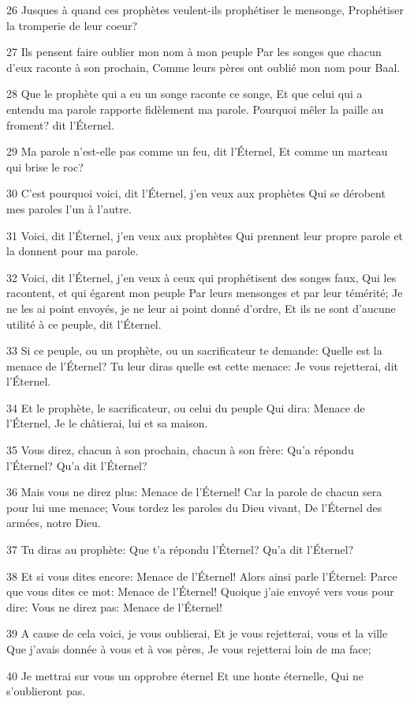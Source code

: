 \par 26 Jusques à quand ces prophètes veulent-ils prophétiser le mensonge, Prophétiser la tromperie de leur coeur?
\par 27 Ils pensent faire oublier mon nom à mon peuple Par les songes que chacun d'eux raconte à son prochain, Comme leurs pères ont oublié mon nom pour Baal.
\par 28 Que le prophète qui a eu un songe raconte ce songe, Et que celui qui a entendu ma parole rapporte fidèlement ma parole. Pourquoi mêler la paille au froment? dit l'Éternel.
\par 29 Ma parole n'est-elle pas comme un feu, dit l'Éternel, Et comme un marteau qui brise le roc?
\par 30 C'est pourquoi voici, dit l'Éternel, j'en veux aux prophètes Qui se dérobent mes paroles l'un à l'autre.
\par 31 Voici, dit l'Éternel, j'en veux aux prophètes Qui prennent leur propre parole et la donnent pour ma parole.
\par 32 Voici, dit l'Éternel, j'en veux à ceux qui prophétisent des songes faux, Qui les racontent, et qui égarent mon peuple Par leurs mensonges et par leur témérité; Je ne les ai point envoyés, je ne leur ai point donné d'ordre, Et ils ne sont d'aucune utilité à ce peuple, dit l'Éternel.
\par 33 Si ce peuple, ou un prophète, ou un sacrificateur te demande: Quelle est la menace de l'Éternel? Tu leur diras quelle est cette menace: Je vous rejetterai, dit l'Éternel.
\par 34 Et le prophète, le sacrificateur, ou celui du peuple Qui dira: Menace de l'Éternel, Je le châtierai, lui et sa maison.
\par 35 Vous direz, chacun à son prochain, chacun à son frère: Qu'a répondu l'Éternel? Qu'a dit l'Éternel?
\par 36 Mais vous ne direz plus: Menace de l'Éternel! Car la parole de chacun sera pour lui une menace; Vous tordez les paroles du Dieu vivant, De l'Éternel des armées, notre Dieu.
\par 37 Tu diras au prophète: Que t'a répondu l'Éternel? Qu'a dit l'Éternel?
\par 38 Et si vous dites encore: Menace de l'Éternel! Alors ainsi parle l'Éternel: Parce que vous dites ce mot: Menace de l'Éternel! Quoique j'aie envoyé vers vous pour dire: Vous ne direz pas: Menace de l'Éternel!
\par 39 A cause de cela voici, je vous oublierai, Et je vous rejetterai, vous et la ville Que j'avais donnée à vous et à vos pères, Je vous rejetterai loin de ma face;
\par 40 Je mettrai sur vous un opprobre éternel Et une honte éternelle, Qui ne s'oublieront pas.

